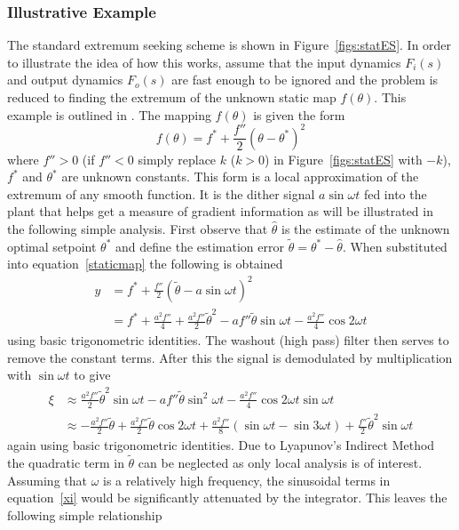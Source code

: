 \subsubsection{Illustrative Example}
The standard extremum seeking scheme is shown in Figure~\ref{figs:statES}. In order to illustrate the idea of how this works, assume that the input dynamics $F_i(s)$ and output dynamics $F_o(s)$ are fast enough to be ignored and the problem is reduced to finding the extremum of the unknown static map $f(\theta)$. This example is outlined in \cite{ArKr03}. The mapping $f(\theta)$ is given the form
\begin{equation}
\label{staticmap}
f(\theta) = f^* + \frac{f''}{2}(\theta - \theta^*)^2
\end{equation}
where $f''>0$ (if $f''<0$ simply replace $k$ ($k>0$) in Figure~\ref{figs:statES} with $-k$), $f^*$ and $\theta^*$ are unknown constants. This form is a local approximation of the extremum of any smooth function. It is the dither signal $a \sin \omega t$ fed into the plant that helps get a measure of gradient information as will be illustrated in the following simple analysis. First observe that $\hat\theta$ is the estimate of the unknown optimal setpoint $\theta^*$ and define the estimation error $\tilde{\theta} = \theta^* - \hat\theta$. When substituted into equation~\eqref{staticmap} the following is obtained
\begin{align}
y &= f^* + \frac{f''}{2}(\tilde\theta - a \sin \omega t)^2\\
&= f^* + \frac{a^2f''}{4} + \frac{a^2f''}{2}\tilde\theta^2 - af''\tilde\theta\sin\omega t - \frac{a^2f''}{4}\cos2\omega t
\end{align}
using basic trigonometric identities. The washout (high pass) filter then serves to remove the constant terms. After this the signal is demodulated by multiplication with $\sin \omega t$ to give
\begin{align}
\xi &\approx \frac{a^2f''}{2}\tilde\theta^2\sin\omega t - af''\tilde\theta\sin^2\omega t - \frac{a^2f''}{4}\cos2\omega t\sin\omega t\\
&\approx  -\frac{a^2f''}{2}\tilde\theta  +  \frac{a^2f''}{2}\tilde\theta\cos2\omega t + \frac{a^2f''}{8}(\sin\omega t - \sin3\omega t) + \frac{f''}{2}\tilde\theta^2\sin\omega t \label{xi}
\end{align}
again using basic trigonometric identities. Due to Lyapunov's Indirect Method the quadratic term in $\tilde\theta$ can be neglected as only local analysis is of interest. Assuming that $\omega$ is a relatively high frequency, the sinusoidal terms in equation~\eqref{xi} would be significantly attenuated by the integrator. This leaves the following simple relationship
